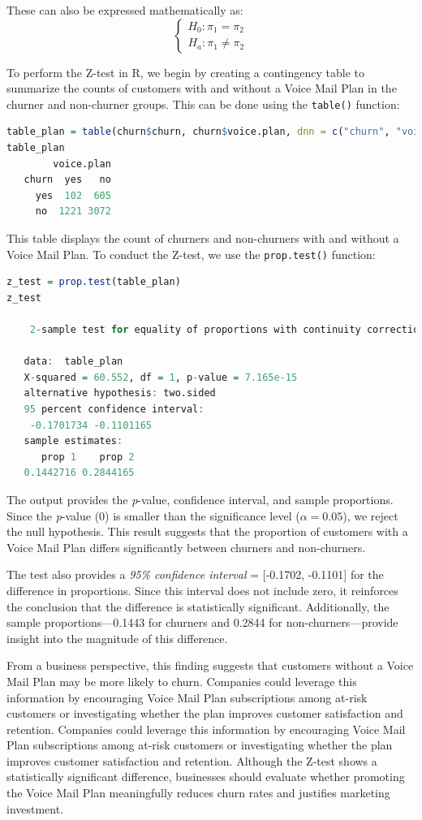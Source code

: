 \documentclass[
]{book}
\newcommand{\passthrough}[1]{#1}
\theoremstyle{definition}
\theoremstyle{definition}
\theoremstyle{definition}
\theoremstyle{definition}
\theoremstyle{remark}
\begin{document}
These can also be expressed mathematically as:
\[
\begin{cases}
    H_0: \pi_1 = \pi_2   \\
    H_a: \pi_1 \neq \pi_2 
\end{cases}
\]

To perform the Z-test in R, we begin by creating a contingency table to summarize the counts of customers with and without a Voice Mail Plan in the churner and non-churner groups. This can be done using the \passthrough{\lstinline!table()!} function:

\begin{lstlisting}[language=R]
table_plan = table(churn$churn, churn$voice.plan, dnn = c("churn", "voice.plan"))
table_plan
        voice.plan
   churn  yes   no
     yes  102  605
     no  1221 3072
\end{lstlisting}

This table displays the count of churners and non-churners with and without a Voice Mail Plan. To conduct the Z-test, we use the \passthrough{\lstinline!prop.test()!} function:

\begin{lstlisting}[language=R]
z_test = prop.test(table_plan)
z_test
   
    2-sample test for equality of proportions with continuity correction
   
   data:  table_plan
   X-squared = 60.552, df = 1, p-value = 7.165e-15
   alternative hypothesis: two.sided
   95 percent confidence interval:
    -0.1701734 -0.1101165
   sample estimates:
      prop 1    prop 2 
   0.1442716 0.2844165
\end{lstlisting}

The output provides the \emph{p}-value, confidence interval, and sample proportions. Since the \emph{p}-value (0) is smaller than the significance level (\(\alpha = 0.05\)), we reject the null hypothesis. This result suggests that the proportion of customers with a Voice Mail Plan differs significantly between churners and non-churners.

The test also provides a \emph{95\% confidence interval} = {[}-0.1702, -0.1101{]} for the difference in proportions. Since this interval does not include zero, it reinforces the conclusion that the difference is statistically significant. Additionally, the sample proportions---0.1443 for churners and 0.2844 for non-churners---provide insight into the magnitude of this difference.

From a business perspective, this finding suggests that customers without a Voice Mail Plan may be more likely to churn. Companies could leverage this information by encouraging Voice Mail Plan subscriptions among at-risk customers or investigating whether the plan improves customer satisfaction and retention. Companies could leverage this information by encouraging Voice Mail Plan subscriptions among at-risk customers or investigating whether the plan improves customer satisfaction and retention. Although the Z-test shows a statistically significant difference, businesses should evaluate whether promoting the Voice Mail Plan meaningfully reduces churn rates and justifies marketing investment.
\end{document}
